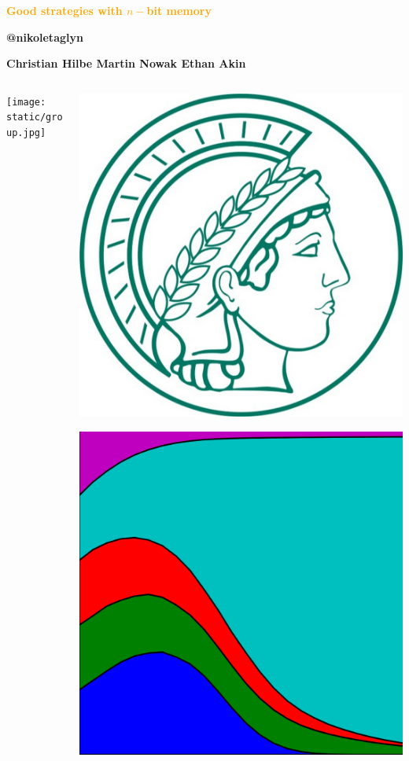 \documentclass{beamer}
\begin{document}
\begin{frame}
    \begin{center}
        \textbf{\LARGE{\textcolor{orange}{Good strategies with $n-$bit memory}}} \\
        \vspace{1cm}

        \textbf{@nikoletaglyn}\\
        \vspace{2cm}
        \pause

        \textbf{Christian Hilbe  \; Martin Nowak \; Ethan Akin}
    \end{center}
\end{frame}

\begin{frame}
    \begin{center}
    \begin{columns}
        \begin{column}{.6\textwidth}
            \texttt{[image: static/group.jpg]}
        \end{column}
        \begin{column}{.4\textwidth}
            \includegraphics[width=.6\textwidth]{static/mpi.jpg}\vspace{8pt}

            \includegraphics[width=.6\textwidth]{static/axelrod-logo.png}
        \end{column}
    \end{columns}
    \end{center}
\end{frame}
\end{document}
